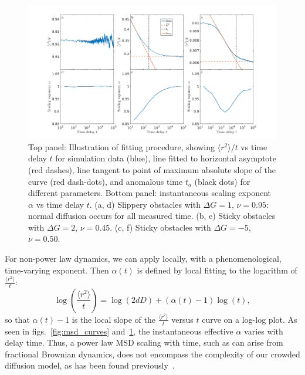 \begin{figure}[!hb]
  \begin{center}
	  \includegraphics[width=175mm]{figs/ch02_soft/soft_msd_fits.png}
  \end{center}
	\caption[Fitting procedure]
    {Top panel: Illustration of fitting procedure, showing
    $ \langle r^2\rangle /t $ vs time delay $ t $ for simulation data (blue),
    line fitted to horizontal asymptote (red dashes), line tangent to
    point of maximum absolute slope of the curve (red dash-dots), and
    anomalous time $ t_a $ (black dots) for different
    parameters. Bottom panel: instantaneous scaling exponent
    $\alpha$ vs time delay $t$. (a, d) Slippery obstacles with $ \Delta G = 1 $,
    $ \nu = 0.95 $: normal diffusion occurs for all measured time.
    (b, e) Sticky obstacles with $ \Delta G = 2 $, $ \nu = 0.45 $.
    (c, f) Sticky obstacles with $ \Delta G = -5 $, $ \nu = 0.50 $.}\label{fig:msd_fits}
\end{figure}

For non-power law dynamics, we can apply  locally,
with a phenomenological, time-varying exponent. Then $\alpha(t)$ is defined by
local fitting to the logarithm of $\frac{\langle r^2 \rangle}{t}$:
%
\begin{equation}
  \label{eqn:log_msd}
  \log \left( \frac{\langle r^2 \rangle}{t} \right)  
    = \log \left( 2dD  \right) + ( \alpha(t) - 1 ) \log \left( t \right),
\end{equation}
%
so that $\alpha(t) - 1 $ is the local slope of the $\frac{\langle r^2 \rangle}
{t}  $ versus $t$ curve on a log-log plot.  As seen in
figs.~\ref{fig:msd_curves} and~\ref{fig:msd_fits}, the instantaneous effective
$\alpha$ varies with delay time.  Thus, a power law MSD scaling with time, such
as can arise from fractional Brownian dynamics, does not encompass the
complexity of our crowded diffusion model, as has been found
previously~\cite{ellery_modeling_16, jeon_protein_16}.


